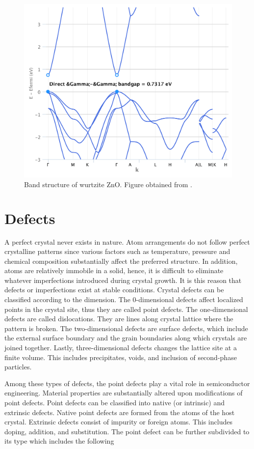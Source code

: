 \begin{figure}[tbh!]
	\centering
	\includegraphics[width=0.48\linewidth]{"images/rrl/bands"}
	\caption[Band structure of wurtzite ZnO]{Band structure of wurtzite ZnO. Figure obtained from \citep{Ong2015}.}
	\label{fig:bands_rrl}
\end{figure}


\section{Defects}
A perfect crystal never exists in nature. Atom arrangements do not follow perfect crystalline patterns since various factors such as temperature, pressure and chemical composition substantially affect the preferred structure. In addition, atoms are relatively immobile in a solid, hence, it is difficult to eliminate whatever imperfections introduced during crystal growth. It is this reason that defects or imperfections exist at stable conditions.  Crystal defects can be classified according to the dimension. The 0-dimensional defects affect localized points in the crystal site, thus they are called point defects. The one-dimensional defects are called dislocations. They are lines along  crystal lattice where the pattern is broken. The two-dimensional defects are surface defects, which include the external surface boundary and the grain boundaries along which crystals are joined together. Lastly, three-dimensional defects changes the lattice site at a finite volume. This includes precipitates, voids, and inclusion of second-phase particles.

Among these types of defects, the point defects play a vital role in semiconductor engineering. Material properties are substantially altered upon modifications of point defects. Point defects can be classified into native (or intrinsic) and extrinsic defects. Native point defects are formed from the atoms of the host crystal. Extrinsic defects consist of impurity or foreign atoms. This includes doping, addition, and substitution. The point defect can be further subdivided to its type which includes the following

